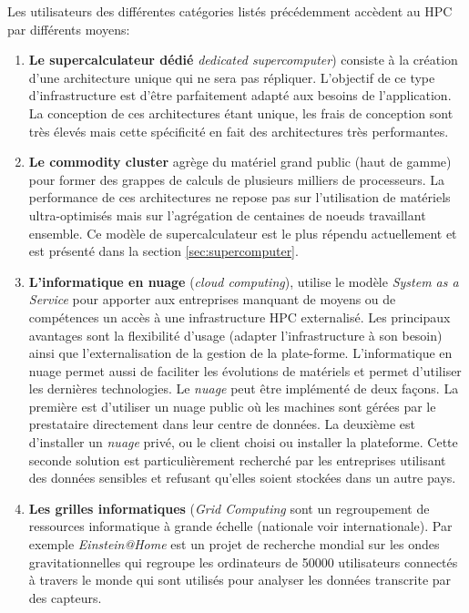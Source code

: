         Les utilisateurs des différentes catégories listés précédemment accèdent au HPC par différents moyens:
        \begin{enumerate}
            
            \item \textbf{Le supercalculateur dédié} \textit{dedicated supercomputer}) consiste à la création d'une architecture unique qui ne sera pas répliquer. L'objectif de ce type d'infrastructure est d'être parfaitement adapté aux besoins de l'application. La conception de ces architectures étant unique, les frais de conception sont très élevés mais cette spécificité en fait des architectures très performantes. 
            
            \item \textbf{Le commodity cluster} agrège du matériel grand public (haut de gamme) pour former des grappes de calculs de plusieurs milliers de processeurs. La performance de ces architectures ne repose pas sur l'utilisation de matériels ultra-optimisés mais sur l'agrégation de centaines de noeuds travaillant ensemble. Ce modèle de supercalculateur est le plus répendu actuellement et est présenté dans la section \autoref{sec:supercomputer}.  
            
            \item \textbf{L'informatique en nuage} (\textit{cloud computing}),  utilise le modèle \textit{System as a Service} pour apporter aux entreprises manquant de moyens ou de compétences un accès à une infrastructure HPC externalisé. Les principaux avantages sont la flexibilité d'usage (adapter l'infrastructure à son besoin) ainsi que l'externalisation de la gestion de la plate-forme. L'informatique en nuage permet aussi de faciliter les évolutions de matériels et permet d'utiliser les dernières technologies. Le \textit{nuage} peut être implémenté de deux façons. La première est d'utiliser un nuage public où les machines sont gérées par le prestataire directement dans leur centre de données. La deuxième est d'installer un \textit{nuage} privé, ou le client choisi ou installer la plateforme. Cette seconde solution est particulièrement recherché par les entreprises utilisant des données sensibles et refusant qu'elles soient stockées dans un autre pays. 
            
            
        \item \textbf{Les grilles informatiques} (\textit{Grid Computing} sont un regroupement de ressources informatique à grande échelle (nationale voir internationale). Par exemple \textit{Einstein@Home} \cite{PhysRevD.80.042003} est un projet de recherche mondial sur les ondes gravitationnelles  qui regroupe les ordinateurs de 50000 utilisateurs connectés à travers le monde qui sont utilisés pour  analyser les données transcrite par des capteurs.
        \end{enumerate}
    

